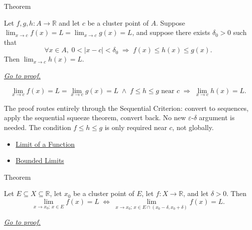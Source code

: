 
\begin{theorembox}{Theorem}
\begin{theorem}
\label{thm:squeeze-function-limits}
Let $f, g, h : A \to \mathbb{R}$ and let $c$ be a cluster point of
$A$. Suppose $\lim_{x\to c}f(x)=L =
\lim_{x\to c}g(x)=L$, and suppose there exists
$\delta_0 > 0$ such that
\[
  \forall x \in A,\;
  0 < |x - c| < \delta_0
  \;\Rightarrow\;
  f(x) \leq h(x) \leq g(x).
\]
Then $\lim_{x\to c}h(x)=L$.

\smallskip\noindent
\hyperref[prf:squeeze-function-limits]{\textit{Go to proof.}}
\end{theorem}
\end{theorembox}

\begin{remark*}
\[
  \lim_{x\to c}f(x)=L
  = \lim_{x\to c}g(x)=L
  \;\wedge\;
  f \leq h \leq g \text{ near } c
  \;\Rightarrow\;
  \lim_{x\to c}h(x)=L.
\]
\end{remark*}

\begin{remark*}[Interpretation]
The proof routes entirely through the Sequential Criterion: convert
to sequences, apply the sequential squeeze theorem, convert back. No
new $\varepsilon$-$\delta$ argument is needed. The condition
$f \leq h \leq g$ is only required near $c$, not globally.
\end{remark*}

\begin{dependencies}
\begin{itemize}
  \item \hyperref[def:limit-function]{Limit of a Function}
  \item \hyperref[thm:bounded-limits]{Bounded Limits}
\end{itemize}
\end{dependencies}


\begin{theorembox}{Theorem}
\begin{theorem}
\label{thm:limits-are-local}
Let $E \subseteq X \subseteq \mathbb{R}$, let $x_0$ be a cluster
point of $E$, let $f : X \to \mathbb{R}$, and let $\delta > 0$.
Then
\[
  \lim_{x\to x_0;\,x\in E}f(x)=L
  \;\iff\;
  \lim_{x\to x_0;\,x\in E\cap(x_0-\delta,x_0+\delta)}f(x)=L.
\]

\smallskip\noindent
\hyperref[prf:limits-are-local]{\textit{Go to proof.}}
\end{theorem}
\end{theorembox}

